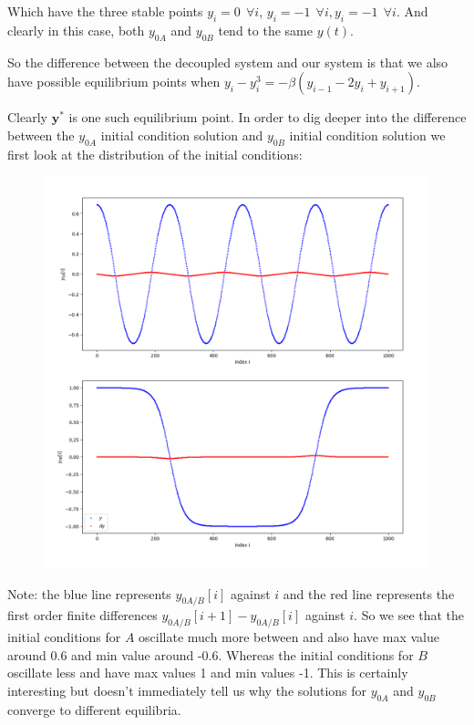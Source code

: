 \documentclass[a4paper, oneside]{book}
\begin{document}
Which have the three stable points $y_{i} = 0 ~ ~ \forall i$, $y_{i} = -1 ~ ~ \forall i, y_{i} = -1 ~ ~ \forall i$. And clearly in this case,
both $y_{0A}$ and $y_{0B}$ tend to the same $y(t)$.

So the difference between the decoupled system and our system is that we also have
possible equilibrium points when $y_{i} - y_{i}^{3} = - \beta(y_{i-1} -2y_{i} + y_{i+1})$.

Clearly $\mathbf{y}^*$ is one such equilibrium point. In order to dig deeper into the difference between
the $y_{0A}$ initial condition solution and $y_{0B}$ initial condition solution we first look at the distribution of the initial conditions:
\begin{figure}[htpb]
    \centering
    \includegraphics[width=1.0\textwidth]{./images/dist_of_init.png}
    \caption{}
\end{figure}
Note: the blue line represents $y_{0A/B}[i]$ against $i$ and the red line represents the first order
finite differences $y_{0A / B}[i + 1] - y_{0A / B}[i]$ against $i$. So we see that the initial conditions for $A$
oscillate much more between and also have max value around 0.6 and min value around -0.6. Whereas the initial conditions for $B$ oscillate less and have max values 1 and min values
-1. This is certainly interesting but doesn't immediately tell us why the solutions for
$y_{0A}$ and $y_{0B}$ converge to different equilibria.
\end{document}
